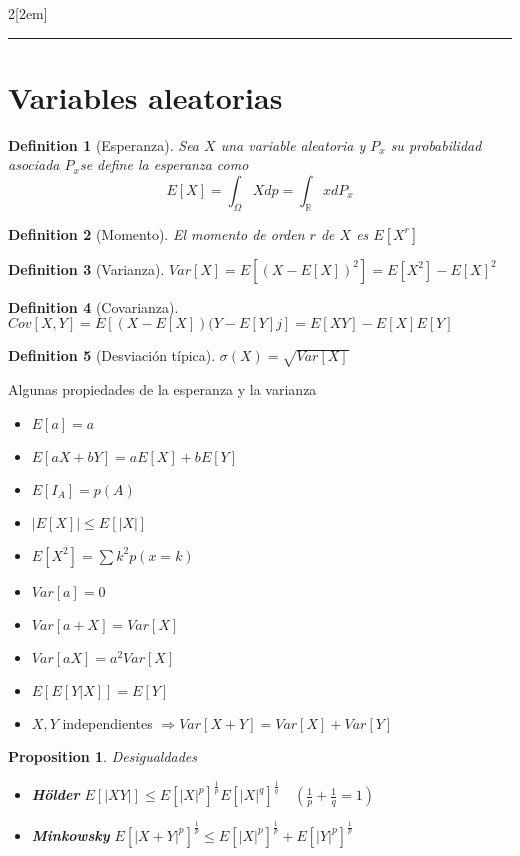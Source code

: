 \documentclass{myclass}
\newtheorem*{proposition}{Proposition}
\newtheorem*{definition}{Definition}
\begin{document}
\begin{multicols}{2}[\columnsep2em]
\hrule

\section{Variables aleatorias}

\begin{definition}[Esperanza] Sea $X$ una variable aleatoria y  $P_x$ su probabilidad asociada $P_x$se define la esperanza como
   \[
E[X]= \int_\Omega Xdp = \int_{\mathbb{R}} xdP_x  
  \] 
\end{definition}

\begin{definition}[Momento] El momento de orden $r$ de  $X$ es  $E[X^r]$
\end{definition}

\begin{definition}[Varianza] $Var[X] = E[(X-E[X])^2] = E[X^2]-E[X]^2 $ 
\end{definition}

\begin{definition}[Covarianza] $Cov[X, Y] = E[(X-E[X])(Y-E[Y]j] = E[XY]-E[X]E[Y] $ 
\end{definition}

\begin{definition}[Desviación típica] $\sigma (X) = \sqrt{Var[X]} $
\end{definition}

\columnbreak

Algunas propiedades de la esperanza y la varianza
\begin{itemize}[topsep=-6pt, itemsep=0pt]
  \item $E[a]=a$
  \item $E[aX+bY]=aE[X]+bE[Y]$
  \item $E[I_A]=p(A)$
  \item $|E[X]|\le E[|X|]$
  \item $E[X^2] = \sum k^2 p(x=k)$
  \item $Var[a]=0$
  \item $Var[a+X] = Var[X]$
  \item $Var[aX]=a^2Var[X]$
  \item $E[E[Y|X]] = E[Y]$
  \item $X, Y$ independientes  $\Rightarrow Var[X+Y] = Var[X]+Var[Y]$
\end{itemize}

\begin{proposition}
Desigualdades
\begin{itemize}[topsep=-6pt, itemsep=0pt]
  \item \textbf{Hölder} $E[|XY|] \le  E[|X|^p]^{\frac{1}{p}}E[|X|^q]^{\frac{1}{q}} \quad (\frac{1}{p}+\frac{1}{q} =1)$ 
  \item \textbf{Minkowsky} $E[|X+Y|^p]^{\frac{1}{p}}\le E[|X|^p]^{\frac{1}{p}}+E[|Y|^p]^{\frac{1}{p}}$ 
\end{itemize}
\end{proposition}


\end{multicols}
\end{document}
